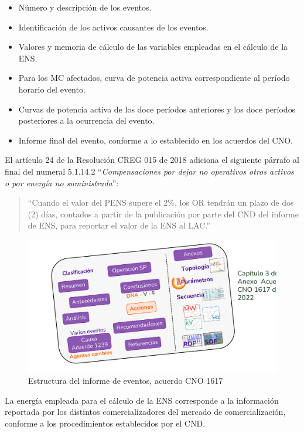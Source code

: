 \documentclass[a5paper]{book}%
\begin{document}
\begin{itemize}
	\item Número y descripción de los eventos.
	\item Identificación de los activos causantes de los eventos.
	\item Valores y memoria de cálculo de las variables empleadas en el cálculo de la \ac{ENS}.
	\item Para los \ac{MC} afectados, curva de potencia activa correspondiente al período horario del evento.
	\item Curvas de potencia activa de los doce períodos anteriores y los doce períodos posteriores a la ocurrencia del evento.
	\item Informe final del evento, conforme a lo establecido en los acuerdos del \ac{CNO}.
\end{itemize}

El artículo 24 de la Resolución CREG 015 de 2018 adiciona el siguiente párrafo al final del numeral 5.1.14.2 “\textit{Compensaciones por dejar no operativos otros activos o por energía no suministrada}”:  

\begin{quote}
	“Cuando el valor del \ac{PENS} supere el 2\%, los \ac{OR} tendrán un plazo de dos (2) días, contados a partir de la publicación por parte del \ac{CND} del informe de \ac{ENS}, para reportar el valor de la \ac{ENS} al \ac{LAC}.”
\end{quote}

\begin{figure}[H]
	\centering
	\includegraphics[width=\linewidth]{estructura_informe_eventos1617}
	\caption{Estructura del informe de eventos, acuerdo CNO 1617}
	\label{fig:estructurainforme}
\end{figure}

La energía empleada para el cálculo de la \ac{ENS} corresponde a la información reportada por los distintos comercializadores del mercado de comercialización, conforme a los procedimientos establecidos por el \ac{CND}.
\end{document}
